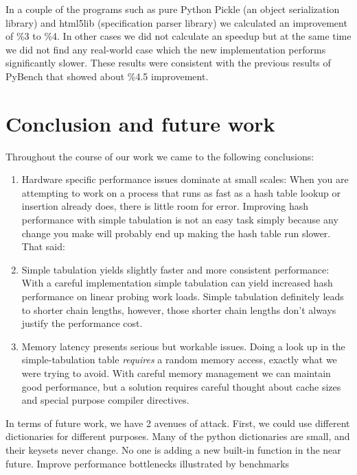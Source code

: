 \documentclass[11pt]{article}
\begin{document}
In a couple of the programs such as pure Python Pickle (an object serialization library) and html5lib (specification parser library) we calculated an improvement of \%3 to \%4. In other cases we did not calculate an speedup but at the same time we did not find any real-world case which the new implementation performs significantly slower. These results were consistent with the previous results of PyBench that showed about \%4.5 improvement.
 
\section{Conclusion and future work}
Throughout the course of our work we came to the following conclusions:
\begin{enumerate}
\item Hardware specific performance issues dominate at small scales: When you are attempting to work on a process that runs as fast as a hash table lookup or insertion already does, there is little room for error.  Improving hash performance with simple tabulation is not an easy task simply because any change you make will probably end up making the hash table run slower.  That said:

\item Simple tabulation yields slightly faster and more consistent performance: With a careful implementation simple tabulation can yield increased hash performance on linear probing work loads. Simple tabulation definitely leads to shorter chain lengths, however, those shorter chain lengths don’t always justify the performance cost.

\item Memory latency presents serious but workable issues.  Doing a look up in the simple-tabulation table \emph{requires} a random memory access, exactly what we were trying to avoid. With careful memory management we can maintain good performance, but a solution requires careful thought about cache sizes and special purpose compiler directives.

\end{enumerate}

In terms of future work, we have 2 avenues of attack. First, we could use different dictionaries for different purposes. Many of the python dictionaries are small, and their keysets never change. No one is adding a new built-in function in the near future. 
Improve performance bottlenecks illustrated by benchmarks
\end{document}
